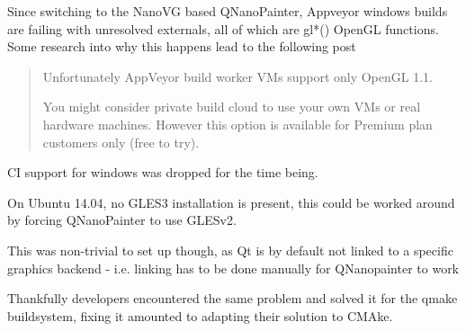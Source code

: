 Since switching to the NanoVG based QNanoPainter, Appveyor windows builds are failing with unresolved externals, all of which are gl*() OpenGL functions.
Some research into why this happens lead to the following post
\begin{quote}
Unfortunately AppVeyor build worker VMs support only OpenGL 1.1.

You might consider private build cloud to use your own VMs or real hardware machines. However this option is available for Premium plan customers only (free to try).
\end{quote}

CI support for windows was dropped for the time being.

On Ubuntu 14.04, no GLES3 installation is present, this could be worked around by forcing QNanoPainter to use GLESv2.

This was non-trivial to set up though, as Qt is by default not linked to a specific graphics backend - i.e. linking has to be done manually for QNanopainter to work

Thankfully developers encountered the same problem and solved it for the qmake buildsystem, fixing it amounted to adapting their solution to CMAke.
